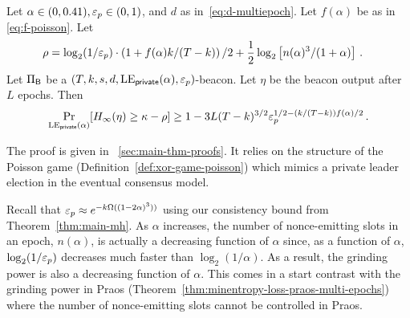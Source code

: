 \begin{theorem}\label{thm:beacon-poisson-multi-epoch}
  Let $\alpha \in (0, 0.41), \mathsf{\varepsilon}_p \in (0,1)$, 
  and $d$ as in~\eqref{eq:d-multiepoch}. 
  Let $f(\alpha)$ be as in \eqref{eq:f-poisson}.
  Let
  \begin{align}
      \rho&= \log_2(1/\mathsf{\varepsilon}_p) \cdot \left(1 + f(\alpha) k/(T-k) \right)/2
        + \frac{1}{2} \log_2 \left[ n(\alpha)^3 /(1+\alpha) \right] 
        \,.
        \label{eq:rho-poisson}
  \end{align}
  Let $\Pi_{\mathsf{B}}$ be a $(T,k,s,d,\mathrm{LE}_\mathsf{private}(\alpha), \mathsf{\varepsilon}_p)$-beacon.
  Let $\eta$ be the beacon output after $L$ epochs. 
  Then 
  $$
    \Pr_{\mathrm{LE}_\mathsf{private}(\alpha)}[H_\infty(\eta) \geq \kappa - \rho ] \geq 
      1 - 3 L (T - k)^{3/2} \mathsf{\varepsilon}_p^{1/2 - (k/(T-k)) f(\alpha)/2}
    \,.
  $$
\end{theorem}
The proof is given in \Section~\ref{sec:main-thm-proofs}. 
It relies on the structure of the Poisson game (Definition~\ref{def:xor-game-poisson}) 
which mimics a private leader election in the eventual consensus model.


Recall that $\mathsf{\varepsilon}_p \approx e^{-k \Omega((1 - 2\alpha)^3))}$ 
using our consistency bound from Theorem~\ref{thm:main-mh}.
As $\alpha$ increases, 
the number of nonce-emitting slots in an epoch, $n(\alpha)$, 
is actually a decreasing function of $\alpha$ 
since, as a function of $\alpha$, 
$\log_2(1/\mathsf{\varepsilon}_p)$ decreases much faster than $\log_2(1/\alpha)$. 
As a result, the grinding power is also a decreasing function of $\alpha$. 
This comes in a start contrast with the grinding power in Praos 
(Theorem~\ref{thm:minentropy-loss-praos-multi-epochs}) 
where the number of nonce-emitting slots cannot be controlled in Praos. 



